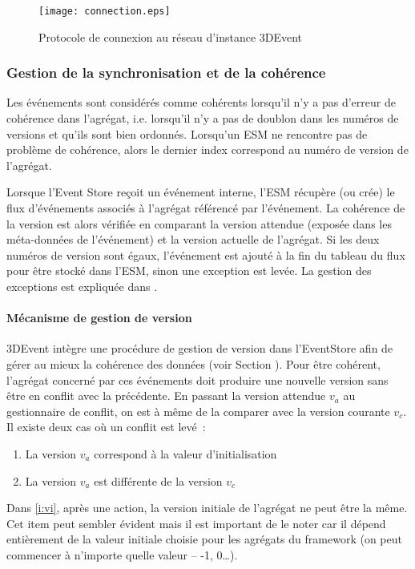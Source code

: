 \begin{figure}[h]
	\noindent
	\centering
	\texttt{[image: connection.eps]}
	\caption{Protocole de connexion au réseau d'instance 3DEvent}
	\label{fig:connexionpairs}
\end{figure}

\subsubsection{Gestion de la synchronisation et de la cohérence}
Les événements sont considérés comme \og cohérents\fg{}  lorsqu'il n'y a pas 
d'erreur de cohérence dans l'agrégat, i.e. lorsqu'il n'y a pas de doublon dans les 
numéros de versions et qu'ils sont bien ordonnés. Lorsqu'un \gls{ESM} ne 
rencontre pas de problème de cohérence, alors le 
dernier index correspond au numéro de version de l'agrégat. 

Lorsque l'Event Store reçoit un événement interne, l'\gls{ESM} récupère (ou crée) 
le flux d'événements associés à l'agrégat référencé par l'événement. 
La cohérence de la version est alors vérifiée en comparant la version attendue 
(exposée dans les méta-données de l'événement) et la version actuelle de 
l'agrégat. 
Si les deux numéros de version sont égaux, l'événement est ajouté à la fin du 
tableau du flux pour être stocké dans l'\gls{ESM}, sinon une exception est levée. 
La gestion des exceptions est expliquée dans . 

\paragraph{Mécanisme de gestion de version}
3DEvent intègre une procédure de gestion de version dans l'\gls{EventStore} afin 
de gérer au mieux la cohérence des données (voir Section ). 
Pour être cohérent, l'agrégat concerné par ces 
événements doit produire une nouvelle version sans être en conflit avec la 
précédente. En passant la version attendue $v_a$ au gestionnaire de conflit, on 
est à même de la comparer avec la version courante $v_c$. Il existe deux cas où 
un conflit est levé~: 
\begin{enumerate}[label=\alph*)]
	\item \label{i:vi} La version $v_a$ correspond à la valeur d'initialisation
	\item \label{i:vdiff} La version $v_a$ est différente de la version $v_c$
\end{enumerate}
Dans \ref{i:vi}, après une action, la version initiale de l'agrégat ne 
peut être la même. Cet item peut sembler évident mais il est important de le noter 
car il dépend entièrement de la valeur initiale choisie pour les agrégats du 
\gls{framework} (on peut commencer à n'importe quelle valeur -- -1, 0\ldots).



